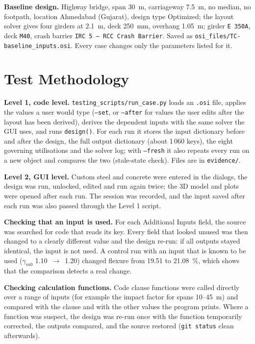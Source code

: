 \documentclass[10pt,a4paper]{article}
\begin{document}
\textbf{Baseline design.} Highway bridge, span 30~m, carriageway 7.5~m, no median, no footpath, location Ahmedabad (Gujarat), design type Optimized; the layout solver gives four girders at 2.1~m, deck 250~mm, overhang 1.05~m; girder \texttt{E 350A}, deck \texttt{M40}, crash barrier \texttt{IRC 5 -- RCC Crash Barrier}. Saved as \texttt{osi\_files/TC-baseline\_inputs.osi}. Every case changes only the parameters listed for it.

\section{Test Methodology}
\textbf{Level 1, code level.} \texttt{testing\_scripts/run\_case.py} loads an \texttt{.osi} file, applies the values a user would type (\texttt{--set}, or \texttt{--after} for values the user edits after the layout has been derived), derives the dependent inputs with the same solver the GUI uses, and runs \texttt{design()}. For each run it stores the input dictionary before and after the design, the full output dictionary (about 1\,060 keys), the eight governing utilisations and the solver log; with \texttt{--fresh} it also repeats every run on a new object and compares the two (stale-state check). Files are in \texttt{evidence/}.

\textbf{Level 2, GUI level.} Custom steel and concrete were entered in the dialogs, the design was run, unlocked, edited and run again twice; the 3D model and plots were opened after each run. The session was recorded, and the input saved after each run was also passed through the Level 1 script.

\textbf{Checking that an input is used.} For each Additional Inputs field, the source was searched for code that reads its key. Every field that looked unused was then changed to a clearly different value and the design re-run: if all outputs stayed identical, the input is not used. A control run with an input that is known to be used ($\gamma_{m0}$ 1.10~$\rightarrow$~1.20) changed flexure from 19.51 to 21.08~\%, which shows that the comparison detects a real change.

\textbf{Checking calculation functions.} Code clause functions were called directly over a range of inputs (for example the impact factor for spans 10--45~m) and compared with the clause and with the other values the program prints. Where a function was suspect, the design was re-run once with the function temporarily corrected, the outputs compared, and the source restored (\texttt{git status} clean afterwards).
\end{document}
